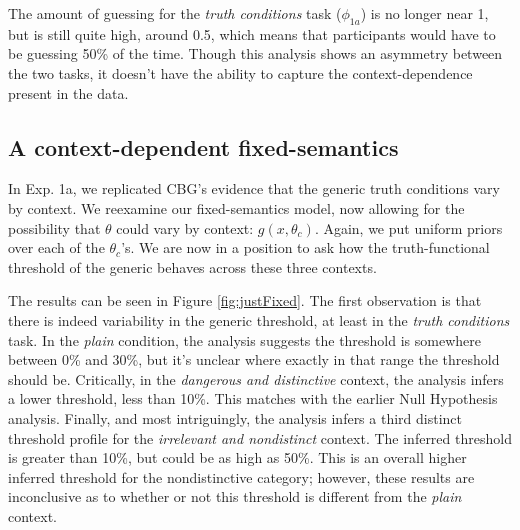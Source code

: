 \documentclass[10pt,letterpaper]{article}
\begin{document}
The amount of guessing for the \emph{truth conditions} task ($\phi_{1a}$) is no longer near 1, but is still quite high, around 0.5, which means that participants would have to be guessing 50\% of the time. Though this analysis shows an asymmetry between the two tasks, it doesn't have the ability to capture the context-dependence present in the data. 



\subsection{A context-dependent fixed-semantics}

In Exp. 1a, we replicated CBG's evidence that the generic truth conditions vary by context. We reexamine our fixed-semantics model, now allowing for the possibility that $\theta$ could vary by context: $g(x,\theta_{c})$.
Again, we put uniform priors over each of the $\theta_{c}$'s. We are now in a position to ask how the truth-functional threshold of the generic behaves across these three contexts. 


The results can be seen in Figure \ref{fig:justFixed}. The first observation is that there is indeed variability in the generic threshold, at least in the \emph{truth conditions} task. In the \emph{plain} condition, the analysis suggests the threshold is somewhere between 0\% and 30\%, but it's unclear where exactly in that range the threshold should be. Critically, in the \emph{dangerous and distinctive} context, the analysis infers a lower threshold, less than 10\%. This matches with the earlier Null Hypothesis analysis. Finally, and most intriguingly, the analysis infers a third distinct threshold profile for the \emph{irrelevant and nondistinct} context.  The inferred threshold is greater than 10\%, but could be as high as 50\%. This is an overall higher inferred threshold for the nondistinctive category; however, these results are inconclusive as to whether or not this threshold is different from the \emph{plain} context.
\end{document}
